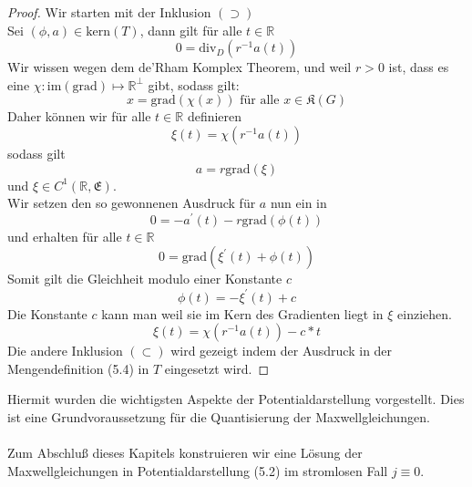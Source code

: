 \documentclass[11pt,a4paper,leqno]{report}
\numberwithin{equation}{chapter}
\begin{document}
\begin{proof}
Wir starten mit der Inklusion $(\supset)$\\
Sei $(\phi, a)\in \text{kern}(T)$, dann gilt f\"ur alle $t\in\mathbb{R}$
\begin{equation*}
	0 = \text{div}_D(r^{-1}a(t))
\end{equation*} 
Wir wissen wegen dem de'Rham Komplex Theorem, und weil $r>0$ ist, dass es eine  $\chi:\text{im}(\text{grad})\mapsto \mathbb{R}^\perp$ gibt, sodass gilt:
\begin{equation*}
	x = \text{grad}(\chi(x)) \text{ f\"ur  alle }x\in\mathfrak{K}(G)
\end{equation*}
Daher k\"onnen wir f\"ur alle $t\in\mathbb{R}$ definieren 
\begin{equation*}
\xi(t) = \chi(r^{-1}a(t))
\end{equation*} sodass gilt
\begin{equation*}
	a=r\text{grad}(\xi)
\end{equation*} und $\xi\in C^1(\mathbb{R},\mathfrak{E})$.\\
Wir setzen den so gewonnenen Ausdruck f\"ur $a$ nun ein in
\begin{equation*}
	0=-a^\prime(t) - r\text{grad}(\phi(t))
\end{equation*} 
und erhalten f\"ur alle $t\in\mathbb{R}$
\begin{equation*}
0=\text{grad}(\xi^\prime(t)+\phi(t))
\end{equation*} 
Somit gilt die Gleichheit modulo einer Konstante $c$
\begin{equation*}
\phi(t)=-\xi^\prime(t) +c
\end{equation*}
Die Konstante $c$ kann man weil sie im Kern des Gradienten liegt in $\xi$ einziehen.
\begin{equation*}
	\xi(t) = \chi(r^{-1}a(t)) -c*t
\end{equation*}
\noindent
Die andere Inklusion $(\subset)$ wird gezeigt indem der Ausdruck in der Mengendefinition (5.4) in $T$ eingesetzt wird.
\end{proof}
\noindent
Hiermit wurden die wichtigsten Aspekte der Potentialdarstellung vorgestellt. Dies ist eine Grundvoraussetzung f\"ur die Quantisierung der Maxwellgleichungen.\\
\\
Zum Abschlu\ss{} dieses Kapitels konstruieren wir eine L\"osung der Maxwellgleichungen in Potentialdarstellung (5.2) im stromlosen Fall $j\equiv 0$.\\
\\
\end{document}
